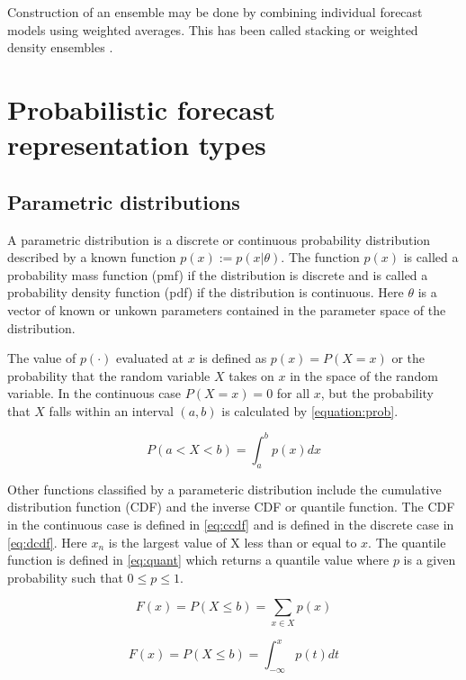 \documentclass[11pt,notitlepage]{isuthesis}
\begin{document}
Construction of an ensemble may be done by combining individual forecast 
models using weighted averages. This has been called stacking 
\cite[]{wolpert1992stacked} or weighted density ensembles 
\cite[]{ray2018prediction}. 

\section{Probabilistic forecast representation types}
\subsection{Parametric distributions}
\label{section:pardist}
A parametric distribution is a discrete or continuous probability distribution 
described by a known function $p(x) := p(x|\theta)$. The function $p(x)$ is 
called a probability mass function (pmf) if the distribution is discrete and 
is called a probability density function
(pdf) if the distribution is continuous. Here $\theta$ is a vector of known or 
unkown parameters contained in the parameter space of the distribution. 

The value of $p(\cdot)$ evaluated at $x$ is defined as 
$p(x) = P(X = x)$ or the probability that the random variable $X$ takes
on $x$ in the space of the random variable. In the continuous case 
$P(X = x) = 0$ for all $x$, but the probability 
that $X$ falls within an interval $(a,b)$ is calculated by 
\eqref{equation:prob}.

\begin{equation}
\label{equation:prob}
  P(a < X < b) = \int_a^b p(x) dx
\end{equation}

Other functions classified by a parameteric distribution include the cumulative
distribution function (CDF) and the inverse CDF or quantile function. The CDF 
in the continuous case is defined in \eqref{eq:ccdf} and is defined in the 
discrete case in \eqref{eq:dcdf}. Here $x_n$ is the largest value of X less than 
or equal to $x$.
The quantile function is defined in \eqref{eq:quant} which returns a quantile 
value where $p$ is a given probability such that $0\leq p \leq 1$.

\begin{equation}
\label{eq:dcdf}
  F(x) = P(X \leq b) = \sum_{x \in X} p(x)
\end{equation}

\begin{equation}
\label{eq:ccdf}
  F(x) = P(X \leq b) = \int_{-\infty}^x p(t) dt
\end{equation}
\end{document}

